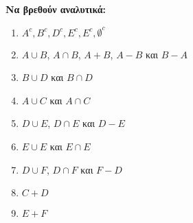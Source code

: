 \documentclass[a4paper,12pt]{article}
\begin{document}
\begin{enumerate}
\textbf{Να βρεθούν αναλυτικά: }
\begin{enumerate}
\item $A^c, B^c, D^c, E^c, E^c, \emptyset^c$
\item $A\cup B$, $A\cap B$, $A+B$, $Α-Β$ και $Β-Α$ 
\item $B\cup D$ και $B\cap D$
\item $A\cup C$ και $A\cap C$
\item $D\cup E$, $D\cap E$ και $D-E$
\item $E\cup E$ και $E\cap E$
\item $D\cup F$, $D\cap F$ και $F-D$
\item $C+D$
\item $E+F$
\end{enumerate}


\end{enumerate}
\end{document}
